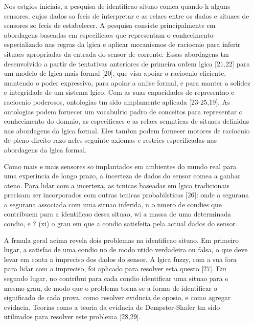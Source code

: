 \documentclass[12pt,a4paper,compsoc]{IEEEtran}
\begin{document}
Nos estgios iniciais, a pesquisa de identificao situao comea quando h alguns sensores, cujos dados so fceis de interpretar e as relaes entre os dados e situaes de sensores so fceis de estabelecer. A pesquisa consiste principalmente em abordagens baseadas em especificaes que representam o conhecimento especializado nas regras da lgica e aplicar mecanismos de raciocnio para inferir situaes apropriadas da entrada do sensor de corrente. Essas abordagens tm desenvolvido a partir de tentativas anteriores de primeira ordem lgica [21,22] para um modelo de lgica mais formal [20], que visa apoiar o raciocnio eficiente, mantendo o poder expressivo, para apoiar a anlise formal, e para manter a solidez e integridade de um sistema lgico. Com as suas capacidades de representao e raciocnio poderosos, ontologias tm sido amplamente aplicada [23-25,19]. As ontologias podem fornecer um vocabulrio padro de conceitos para representar o conhecimento do domnio, as especificaes e as relaes semnticas de situaes definidas nas abordagens da lgica formal. Eles tambm podem fornecer motores de raciocnio de pleno direito  razo neles seguinte axiomas e restries especificadas nas abordagens da lgica formal.

Como mais e mais sensores so implantados em ambientes do mundo real para uma experincia de longo prazo, a incerteza de dados do sensor comea a ganhar ateno. Para lidar com a incerteza, as tcnicas baseadas em lgica tradicionais precisam ser incorporados com outras tcnicas probabilsticas [26]: onde a segurana  a segurana associada com uma situao inferida, n  o nmero de condies que contribuem para a identificao dessa situao, wi  a massa de uma determinada condio, e ? (xi)  o grau em que a condio  satisfeita pela actual dados do sensor.

A frmula geral acima revela dois problemas na identificao situao. Em primeiro lugar, a satisfao de uma condio no  de modo ntido verdadeira ou falsa, o que deve levar em conta  a impreciso dos dados do sensor. A lgica fuzzy, com a sua fora para lidar com a impreciso, foi aplicado para resolver esta questo [27]. Em segundo lugar, no contribui para cada condio identificar uma situao para o mesmo grau, de modo que o problema torna-se a forma de identificar o significado de cada prova, como resolver evidncia de oposio, e como agregar evidncia. Teorias como a teoria da evidncia de Dempster-Shafer tm sido utilizados para resolver este problema [28,29].



\end{document}
